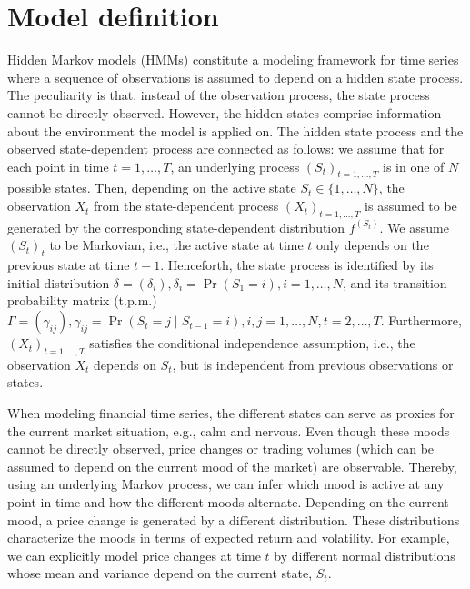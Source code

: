 \documentclass[article,shortnames]{jss}
\begin{document}
\section{Model definition} \label{sec:model_definition} %

Hidden Markov models (HMMs) constitute a modeling framework for time series where a sequence of observations is assumed to depend on a hidden state process. The peculiarity is that, instead of the observation process, the state process cannot be directly observed. However, the hidden states comprise information about the environment the model is applied on. The hidden state process and the observed state-dependent process are connected as follows: we assume that for each point in time $t = 1, \ldots, T$, an underlying process $(S_t)_{t = 1, \ldots, T}$ is in one of $N$ possible states. Then, depending on the active state $S_t \in \{ 1, \ldots, N \}$, the observation $X_t$ from the state-dependent process $(X_t)_{t = 1, \ldots, T}$ is assumed to be generated by the corresponding state-dependent distribution $f^{(S_t)}$. We assume $(S_t)_t$ to be Markovian, i.e., the active state at time $t$ only depends on the previous state at time $t-1$. Henceforth, the state process is identified by its initial distribution $\delta = (\delta_i), \delta_i = \Pr(S_1 = i), i = 1, \ldots, N$, and its transition probability matrix (t.p.m.) $\Gamma = (\gamma_{ij}), \gamma_{ij} = \Pr(S_{t} = j \mid S_{t-1}=i), i,j = 1, \ldots, N, t = 2, \ldots, T$. Furthermore, $(X_t)_{t = 1, \ldots, T}$ satisfies the conditional independence assumption, i.e., the observation $X_t$ depends on $S_t$, but is independent from previous observations or states.

When modeling financial time series, the different states can serve as proxies for the current market situation, e.g., calm and nervous. Even though these moods cannot be directly observed, price changes or trading volumes (which can be assumed to depend on the current mood of the market) are observable. Thereby, using an underlying Markov process, we can infer which mood is active at any point in time and how the different moods alternate. Depending on the current mood, a price change is generated by a different distribution. These distributions characterize the moods in terms of expected return and volatility. For example, we can explicitly model price changes at time $t$ by different normal distributions whose mean and variance depend on the current state, $S_t$.
\end{document}
